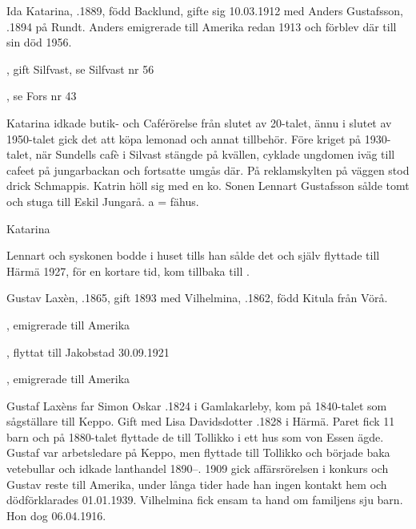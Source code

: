 Ida Katarina, .1889, född Backlund, gifte sig 10.03.1912 med Anders Gustafsson, .1894 på Rundt. Anders emigrerade till Amerika redan 1913 och förblev där till sin död 1956.
\begin{jhchildren}
  \item {}, gift Silfvast, se Silfvast nr 56
  \item {}, se Fors nr 43
\end{jhchildren}
Katarina idkade butik- och Caférörelse från slutet av 20-talet, ännu i slutet av 1950-talet gick det att köpa lemonad och annat tillbehör. Före kriget på 1930-talet, när Sundells cafè i Silvast stängde på kvällen, cyklade ungdomen iväg till cafeet på jungarbackan och fortsatte umgås där. På reklamskylten på väggen stod drick Schmappis. Katrin höll sig med en ko. Sonen Lennart Gustafsson sålde tomt och stuga till Eskil Jungarå. a  = fähus.

Katarina 


Lennart och syskonen bodde i huset tills han sålde det och själv flyttade till Härmä 1927, för en kortare tid, kom tillbaka till .\jhvspace{}


Gustav Laxèn, .1865, gift 1893 med Vilhelmina, .1862, född Kitula från Vörå.
\begin{jhchildren}
  \item {}
  \item {}, emigrerade till Amerika
  \item {}
  \item {}
  \item {}, flyttat till Jakobstad 30.09.1921
  \item {}
  \item {}, emigrerade till Amerika
\end{jhchildren}
Gustaf Laxèns far Simon Oskar .1824 i Gamlakarleby, kom på 1840-talet som sågställare till Keppo. Gift med Lisa Davidsdotter .1828 i Härmä. Paret fick 11 barn och på 1880-talet flyttade de 	till Tollikko i ett hus som von Essen ägde. Gustaf var arbetsledare på Keppo, men flyttade till Tollikko och började baka vetebullar och idkade lanthandel 1890--. 1909 gick affärsrörelsen i konkurs och Gustav reste till Amerika, under långa tider hade han ingen 	kontakt hem och dödförklarades 01.01.1939. Vilhelmina fick ensam ta hand om familjens sju barn. Hon dog 06.04.1916.



